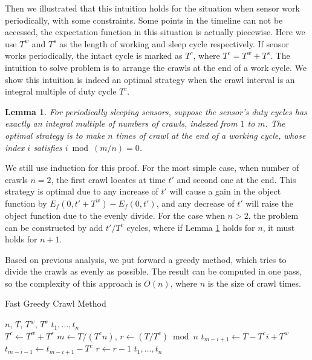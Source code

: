 \documentclass[conference]{IEEEtran}
\newtheorem{lemma}{Lemma}
\begin{document}
Then we illustrated that this intuition holds for the situation when sensor work periodically, with some constraints.
Some points in the timeline can not be accessed, the expectation function in this situation is actually piecewise.
Here we use $T^{w}$ and $T^{s}$ as the length of working and sleep cycle respectively.
If sensor works periodically, the intact cycle is marked as $T^{c}$, where $T^{c}=T^{w}+T^{s}$.
The intuition to solve problem is to arrange the crawls at the end of a work cycle.
We show this intuition is indeed an optimal strategy when the crawl interval is an integral multiple of duty cycle $T^{c}$.
\begin{lemma}
\label{evenly_s}
For periodically sleeping sensors, suppose the sensor's duty cycles has exactly an integral multiple of numbers of crawls, indexed from $1$ to $m$.
The optimal strategy is to make $n$ times of crawl at the end of a working cycle, whose index $i$ satisfies $i \bmod (m/n)=0$.
\end{lemma}
\begin{IEEEproof}
We still use induction for this proof.
For the most simple case, when number of crawls $n=2$, the first crawl locates at time $t'$ and second one at the end. 
This strategy is optimal due to any increase of $t'$ will cause a gain in the object function by $E_f(0,t'+T^{w})-E_f(0,t')$, and any decrease of $t'$ will raise the object function due to the evenly divide.
For the case when $n>2$, the problem can be constructed by add $t'/T^{c}$ cycles, where if Lemma \ref{evenly_s} holds for $n$, it must holds for $n+1$.
\end{IEEEproof}

Based on previous analysis, we put forward a greedy method, which tries to divide the crawls as evenly as possible. 
The result can be computed in one pass, so the complexity of this approach is $O(n)$, where $n$ is the size of crawl times.
\begin{algorithm}
	\caption{Fast Greedy Crawl Method}
	\begin{algorithmic}[1]
		\renewcommand{\algorithmicrequire}{\textbf{Input:}}
		\renewcommand{\algorithmicensure}{\textbf{Output:}}
		\REQUIRE $n$, $T$, $T^w$, $T^s$
		\ENSURE  $t_1,\ldots,t_n$
		\\ 
		\STATE $T^{c} \gets T^{w}+T^{s}$
		\STATE $m \gets T/(T^{c} n)$, $r\gets (T/T^{c})\bmod{n}$
		\STATE $t_{m-i+1}\gets T- T^{c} i + T^{w}$
		\STATE $t_{m-i-1}\gets t_{m-i+1}-T^{c}$
		\STATE $r\gets r-1$
		\ENDIF
		\ENDFOR
		\RETURN $t_1,\ldots,t_n$
	\end{algorithmic} 
\end{algorithm}
\end{document}
